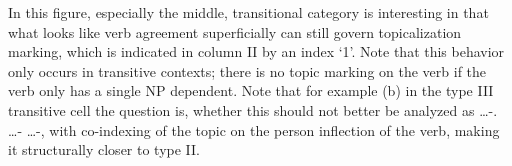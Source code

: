 
In this figure, especially the middle, transitional category is interesting in 
that what looks like verb agreement superficially can still govern 
topicalization marking, which is indicated in column II by an index `1'. Note 
that this behavior only occurs in transitive contexts; there is no topic 
marking on the verb if the verb only has a single NP dependent. Note that for 
example (b) in the type III transitive cell the question is, whether this should 
not better be analyzed as \AgtT{} …-\TsgM{}.\Top{} …-\Top{} …-\Parg{}, with 
co-indexing of the topic on the person inflection of the verb, making it 
structurally closer to type II.

